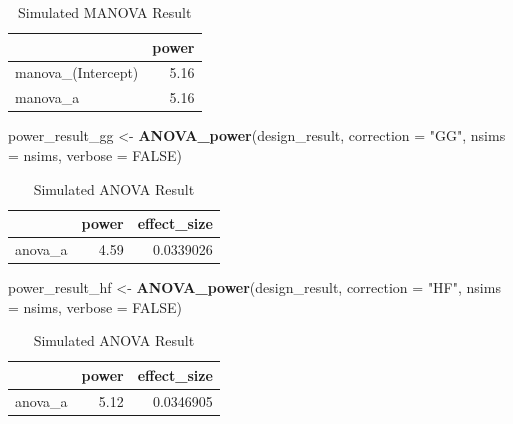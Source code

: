 \documentclass[]{book}
\newenvironment{Shaded}{\begin{snugshade}}{\end{snugshade}}
\newcommand{\DataTypeTok}[1]{\textcolor[rgb]{0.13,0.29,0.53}{#1}}
\newcommand{\KeywordTok}[1]{\textcolor[rgb]{0.13,0.29,0.53}{\textbf{#1}}}
\newcommand{\NormalTok}[1]{#1}
\newcommand{\OtherTok}[1]{\textcolor[rgb]{0.56,0.35,0.01}{#1}}
\newcommand{\StringTok}[1]{\textcolor[rgb]{0.31,0.60,0.02}{#1}}
\begin{document}
\begin{table}[!h]

\caption{\label{tab:unnamed-chunk-180}Simulated MANOVA Result}
\centering
\begin{tabular}{l|r}
\hline
  & power\\
\hline
manova\_(Intercept) & 5.16\\
\hline
manova\_a & 5.16\\
\hline
\end{tabular}
\end{table}

\begin{Shaded}
\begin{Highlighting}[]
\NormalTok{power_result_gg <-}\StringTok{ }\KeywordTok{ANOVA_power}\NormalTok{(design_result, }\DataTypeTok{correction =} \StringTok{"GG"}\NormalTok{,}
                               \DataTypeTok{nsims =}\NormalTok{ nsims, }\DataTypeTok{verbose =} \OtherTok{FALSE}\NormalTok{)}
\end{Highlighting}
\end{Shaded}

\begin{table}[!h]

\caption{\label{tab:unnamed-chunk-182}Simulated ANOVA Result}
\centering
\begin{tabular}{l|r|r}
\hline
  & power & effect\_size\\
\hline
anova\_a & 4.59 & 0.0339026\\
\hline
\end{tabular}
\end{table}

\begin{Shaded}
\begin{Highlighting}[]
\NormalTok{power_result_hf <-}\StringTok{ }\KeywordTok{ANOVA_power}\NormalTok{(design_result, }\DataTypeTok{correction =} \StringTok{"HF"}\NormalTok{,}
                               \DataTypeTok{nsims =}\NormalTok{ nsims, }\DataTypeTok{verbose =} \OtherTok{FALSE}\NormalTok{)}
\end{Highlighting}
\end{Shaded}

\begin{table}[!h]

\caption{\label{tab:unnamed-chunk-184}Simulated ANOVA Result}
\centering
\begin{tabular}{l|r|r}
\hline
  & power & effect\_size\\
\hline
anova\_a & 5.12 & 0.0346905\\
\hline
\end{tabular}
\end{table}
\end{document}
